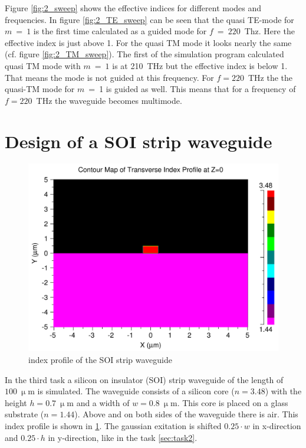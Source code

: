 Figure \ref{fig:2_sweep} shows the effective indices for different modes and frequencies. In figure \ref{fig:2_TE_sweep} can be seen that the quasi TE-mode for $m~=~1$ is the first time calculated as a guided mode for $f~=~220$~Thz.  Here the effective index is just above 1. For the quasi TM mode it looks nearly the same (cf. figure \ref{fig:2_TM_sweep}). The first of the simulation program calculated quasi TM mode with $m~=~1$ is at 210~THz but the effective index is below 1. That means the mode is not guided at this frequency. For $f = 220$~THz the the quasi-TM mode for $m$~=~1 is guided as well.
This means that for a frequency of $f = 220$~THz the waveguide becomes multimode.


\newpage
\section{Design of a SOI strip waveguide}

\begin{figure}[h]%
\centering
\includegraphics[totalheight=5.5 cm]{Grafiken/3_index.pdf}%
\caption{index profile of the SOI strip waveguide}%
\label{fig:index_profile_3}%
\end{figure}
In the third task a silicon on insulator (SOI) strip waveguide of the length of $100~\upmu$m is simulated. The waveguide consists of a silicon core ($n=3.48$) with the height $h=0.7~\upmu$m and a width of $w=0.8~\upmu$m. This core is placed on a glass substrate ($n=1.44$). Above and on both sides of the waveguide there is air. This index profile is shown in \ref{fig:index_profile_3}. The gaussian exitation is shifted $0.25\cdot w$ in x-direction and $0.25\cdot h$ in y-direction, like in the task \ref{sec:task2}.


